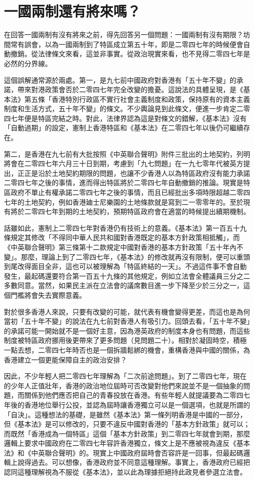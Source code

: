 \section{一國兩制還有將來嗎？}

在回答一國兩制有沒有將來之前，得先回答另一個問題：一國兩制有沒有期限？坊間常有誤會，以為一國兩制到了特區成立第五十年，即是二零四七年的時候便會自動撤銷。從法律條文來看，這並非事實。從政治現實來看，也不見得二零四七年是必然的分界線。

這個誤解通常源於兩處。第一，是九七前中國政府對香港有「五十年不變」的承諾，帶來對港政策會否於二零四七年完全改變的擔憂。這說法的具體呈現，是《基本法》第五條「香港特別行政區不實行社會主義制度和政策，保持原有的資本主義制度和生活方式，五十年不變」的條文。不少輿論見到此條文，便進一步肯定二零四七年便是特區完結之時。對此，法律界認為這是對條文的錯解，《基本法》沒有「自動過期」的設定，憲制上香港特區和《基本法》在二零四七年以後仍可繼續存在。

第二，是香港在九七前有大批按照《中英聯合聲明》附件三批出的土地契約，列明將會在二零四七年六月三十日到期，考慮到「九七問題」在一九七零年代被英方提出，正正是沿於土地契約期限的問題，也讓不少香港人以為特區政府沒有能力承諾二零四七年之後的事情，進而得出特區將於二零四七年自動撤銷的推論。現實是特區政府不單止有權承諾二零四七年之後的事情，而且已經批出多項時限超越二零四七年的土地契約，例如香港廸士尼樂園的土地條款就是寫到二一零零年的。至於現有將於二零四七年到期的土地契約，預期特區政府會在適當的時候提出續期機制。

話雖如此，憲制上二零四七年對香港仍有技術上的意義。《基本法》第一百五十九條規定其修改「不得同中華人民共和國對香港既定的基本方針政策相抵觸」，而《中英聯合聲明》第三條第十二款規定中國對香港的基本方針政策「五十年內不變」。那麼，理論上到了二零四七年，《基本法》的修改就再沒有限制，便可以重頭到尾改得面目全非，這也可以被理解為「特區終結的一天」。不過這件事不會自動發生，最起碼還要符合第一百五十九條的其他規定，例如立法會全體議員三分之二多數同意。當然，如果民主派在立法會的議席數目進一步下降至少於三分之一，這個門檻將會失去實際意義。

對於很多香港人來說，只要有改變的可能，就代表有機會變得更差，而這也是為何當初「五十年不變」的說法在九七前對香港人有吸引力。回頭去看，「五十年不變」的承諾可能一開始就不是一個好主意，因為港英政府的制度本身也有問題，而這些制度被特區政府挪用後更帶來了更多問題（見問題二十）。相對於凝固時空，積極一點去想，二零四七年時否也是一個拆牆鬆綁的機會，重構香港與中國的關係，為香港建立一個更能保障自主的政治安排？

因此，不少年輕人把二零四七年理解為「二次前途問題」。到了二零四七年，現在的少年人正值壯年，香港的政治地位屆時可否改變對他們來說並不是一個抽象的問題，而關係到他們應否把自己的青春投放在香港。有些年輕人就提議要為二零四七年後的香港地位舉行公投，並認為屆時讓香港獨立可以是一個選項，也就是所謂的「自決」。這種想法的基礎，是雖然《基本法》第一條列明香港是中國的一部分，但《基本法》是可以修改的，只要不違反中國對香港的「基本方針政策」就可以；而既然「香港成為一個特區」這個「基本方針政策」到二零四七年就會到期，那麼邏輯上要求中國政府在二零四七年容許香港獨立，條文上是不應被視為違反《基本法》和《中英聯合聲明》的。現實上中國政府屆時會否容許是一回事，但最起碼邏輯上說得過去。可以想像，香港政府並不同意這種理解。事實上，香港政府已經把認同這種理解視為不服從《基本法》，並以此為理據拒絕持此政見者參選立法會。

